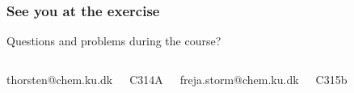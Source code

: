 
\frame
{
    \frametitle{See you at the exercise}

    \centering

    Questions and problems during the course?

    \begin{columns}[t]


            \centering
            \bigskip
            thorsten@chem.ku.dk

            \bigskip
            C314A


            \centering
            \bigskip
            freja.storm@chem.ku.dk

            \bigskip
            C315b

    \end{columns}

}







